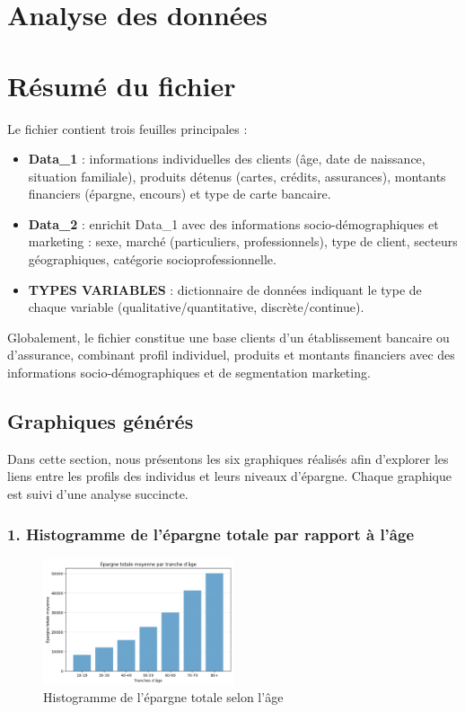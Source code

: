 \section{Analyse des données}
\section*{Résumé du fichier}

Le fichier contient trois feuilles principales :

\begin{itemize}
    \item \textbf{Data\_1} : informations individuelles des clients (âge, date de naissance, situation familiale), produits détenus (cartes, crédits, assurances), montants financiers (épargne, encours) et type de carte bancaire.
    \item \textbf{Data\_2} : enrichit Data\_1 avec des informations socio-démographiques et marketing : sexe, marché (particuliers, professionnels), type de client, secteurs géographiques, catégorie socioprofessionnelle.
    \item \textbf{TYPES VARIABLES} : dictionnaire de données indiquant le type de chaque variable (qualitative/quantitative, discrète/continue).
\end{itemize}

\noindent Globalement, le fichier constitue une base clients d'un établissement bancaire ou d'assurance, combinant profil individuel, produits et montants financiers avec des informations socio-démographiques et de segmentation marketing.

\subsection{Graphiques générés}

Dans cette section, nous présentons les six graphiques réalisés afin d’explorer les liens entre les profils des individus et leurs niveaux d'épargne. Chaque graphique est suivi d'une analyse succincte.

\subsubsection*{1. Histogramme de l'épargne totale par rapport à l'âge}
\begin{figure}[!h]
    \centering
    \includegraphics[width=0.5\textwidth]{images/py/epargneTotal_age.png}
    \caption{Histogramme de l'épargne totale selon l'âge}
\end{figure}

